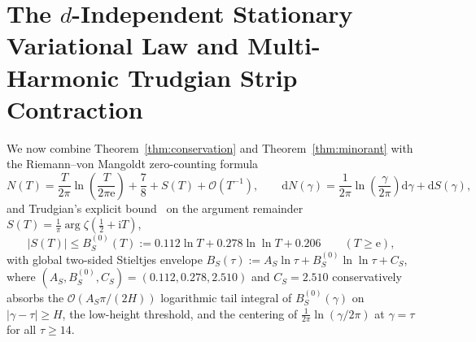 \documentclass[11pt,reqno]{amsart}
\theoremstyle{definition}
\theoremstyle{remark}
\numberwithin{equation}{section}
\newcommand{\dd}{\mathrm{d}}
\newcommand{\ee}{\mathrm{e}}
\newcommand{\ii}{\mathrm{i}}
\begin{document}
\section{The $d$-Independent Stationary Variational Law and Multi-Harmonic Trudgian Strip Contraction}\label{sec:stationary}

We now combine Theorem~\ref{thm:conservation} and Theorem~\ref{thm:minorant} with the Riemann--von Mangoldt zero-counting formula~\cite{titchmarsh1986}
\begin{equation}\label{eq:RvM_formula}
N(T) = \frac{T}{2\pi}\ln\!\left(\frac{T}{2\pi\ee}\right) + \frac{7}{8} + S(T) + \mathcal{O}(T^{-1}), \qquad \dd N(\gamma) = \frac{1}{2\pi}\ln\!\left(\frac{\gamma}{2\pi}\right)\dd\gamma + \dd S(\gamma),
\end{equation}
and Trudgian's explicit bound~\cite{trudgian2014} on the argument remainder $S(T) = \frac{1}{\pi}\arg\zeta(\frac{1}{2} + \ii T)$,
\begin{equation}\label{eq:trudgian_bound}
|S(T)| \le B_S^{(0)}(T) := 0.112\ln T + 0.278\ln\ln T + 0.206 \qquad (T \ge \ee),
\end{equation}
with global two-sided Stieltjes envelope $B_S(\tau) := A_S\ln\tau + B_S^{(0)}\ln\ln\tau + C_S$, where $(A_S, B_S^{(0)}, C_S) = (0.112, 0.278, 2.510)$ and $C_S = 2.510$ conservatively absorbs the $\mathcal{O}(A_S\pi/(2H))$ logarithmic tail integral of $B_S^{(0)}(\gamma)$ on $|\gamma - \tau| \ge H$, the low-height threshold, and the centering of $\frac{1}{2\pi}\ln(\gamma/2\pi)$ at $\gamma = \tau$ for all $\tau \ge 14$.
\end{document}
